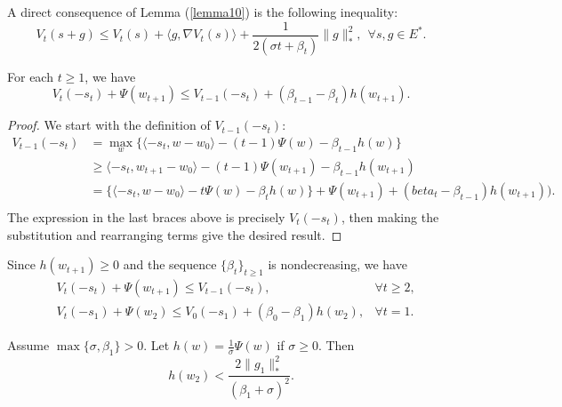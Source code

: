 A direct consequence of Lemma (\ref{lemma10}) is the following inequality:
\begin{equation}\label{48}
	V_t(s+g)\leq V_t(s) + \langle g , \nabla V_t (s) \rangle +\frac{1}{2(\sigma t+\beta_t)}\|g\|_{\ast}^2,~~ \forall s,g\in E^{\ast}.
\end{equation}
\begin{lemma}\label{lemma11}
	For each $t\geq 1$, we have
	\begin{equation}
		V_t (-s_t) +\Psi(w_{t+1})\leq V_{t-1}(-s_t)+(\beta_{t-1}-\beta_t)h(w_{t+1}).
	\end{equation}
\end{lemma}
\begin{proof}
	We start with the definition of $V_{t-1}(-s_t):$\\
	$$
	\begin{aligned}
	V_{t-1}(-s_t) &= \max_w \{ \langle  -s_t,w-w_0    \rangle -(t-1)\Psi(w) - \beta_{t-1}h(w) \} \\
	&\geq \langle  -s_t,w_{t+1}-w_0    \rangle -(t-1)\Psi(w_{t+1}) - \beta_{t-1}h(w_{t+1}) \\
	&= \{ \langle  -s_t,w-w_0    \rangle -t\Psi(w) - \beta_{t}h(w) \} +\Psi(w_{t+1})+(beta_t-\beta_{t-1})h(w_{t+1})). \\
	\end{aligned}
	$$
	The expression in the last braces above is precisely $V_t(-s_t)$, then making the substitution and rearranging terms give the desired result.
\end{proof}
Since $h(w_{t+1})\geq 0$ and the sequence $\{\beta_t\}_{t\geq 1}$ is nondecreasing, we have
\begin{align}
	&V_t(-s_t)+\Psi(w_{t+1})\leq V_{t-1}(-s_t),&\forall t\geq 2,\label{49}\\
	&V_t(-s_1)+\Psi(w_2)\leq V_{0}(-s_1)+(\beta_0-\beta_1)h(w_2),&\forall t=1.\label{50}
\end{align}
\begin{lemma}\label{lemma12}
	Assume $\max \{ \sigma,\beta_1 \}>0$. Let $h(w)=\frac{1}{\sigma}\Psi(w)$ if $\sigma\geq 0$. Then
	\begin{equation}\label{51}
		h(w_2)< \frac{2\|g_1\|^2_{\ast}}{(\beta_1+\sigma)^2}.
	\end{equation}
\end{lemma}

